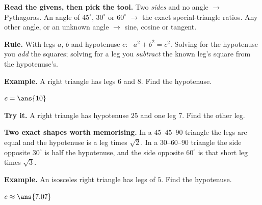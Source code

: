 \documentclass[12pt]{article}
\begin{document}

\begin{formulabox}
\textbf{Read the givens, then pick the tool.} Two \emph{sides} and no angle
$\rightarrow$ Pythagoras. An angle of $45^\circ$, $30^\circ$ or $60^\circ$
$\rightarrow$ the exact special-triangle ratios. Any other angle, or an unknown
angle $\rightarrow$ sine, cosine or tangent.
\end{formulabox}


\begin{formulabox}
\textbf{Rule.} With legs $a$, $b$ and hypotenuse $c$: \ $a^2 + b^2 = c^2$.
Solving for the hypotenuse you \emph{add} the squares; solving for a leg you
\emph{subtract} the known leg's square from the hypotenuse's.
\end{formulabox}

\begin{examplebox}
\textbf{Example.} A right triangle has legs $6$ and $8$. Find the hypotenuse.

$c = \ans{10}$
\end{examplebox}

\begin{tryitbox}
\textbf{Try it.} A right triangle has hypotenuse $25$ and one leg $7$. Find the
other leg.\\[2pt]
\end{tryitbox}


\begin{formulabox}
\textbf{Two exact shapes worth memorising.} In a $45$--$45$--$90$ triangle the
legs are equal and the hypotenuse is a leg times $\sqrt{2}$. In a
$30$--$60$--$90$ triangle the side opposite $30^\circ$ is half the hypotenuse,
and the side opposite $60^\circ$ is that short leg times $\sqrt{3}$.
\end{formulabox}

\begin{examplebox}
\textbf{Example.} An isosceles right triangle has legs of $5$. Find the
hypotenuse.

$c \approx \ans{7.07}$
\end{examplebox}
\end{document}
